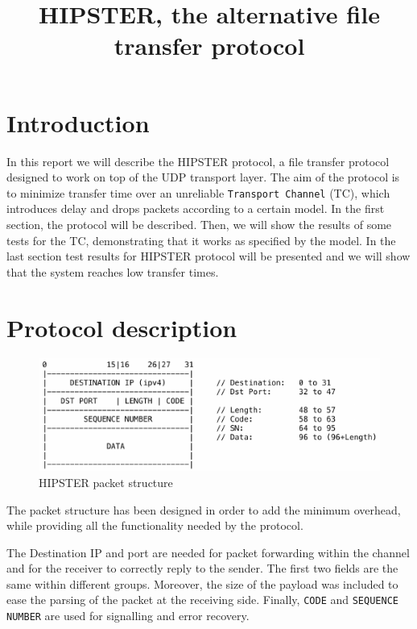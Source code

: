 \documentclass[10pt,twocolumn]{article}
\begin{document}
\title{HIPSTER, the alternative file transfer protocol}
\author{}
\date{}
\maketitle

\section{Introduction}
In this report we will describe the HIPSTER protocol, a file transfer protocol designed to work on top of the UDP transport layer. The aim of the protocol is to minimize transfer time over an unreliable \texttt{Transport Channel} (TC), which introduces delay and drops packets according to a certain model. In the first section, the protocol will be described. Then, we will show the results of some tests for the TC, demonstrating that it works as specified by the model. In the last section test results for HIPSTER protocol will be presented and we will show that the system reaches low transfer times.

\section{Protocol description}
\begin{figure}[htp]
	\centering
	\includegraphics[width=0.95\columnwidth]{tex/images/packet_structure.pdf}
	\caption{HIPSTER packet structure}
	\label{fig:header}
\end{figure}

The packet structure has been designed in order to add the minimum overhead,
while providing all the functionality needed by the protocol.

The Destination IP and port are needed for packet forwarding within the channel
and for the receiver to correctly reply to the sender. The first two fields are the
same within different groups. Moreover, the size of the payload was included to
ease the parsing of the packet at the receiving side. Finally, \texttt{CODE} and
\texttt{SEQUENCE NUMBER} are used for signalling and error recovery.
\end{document}
